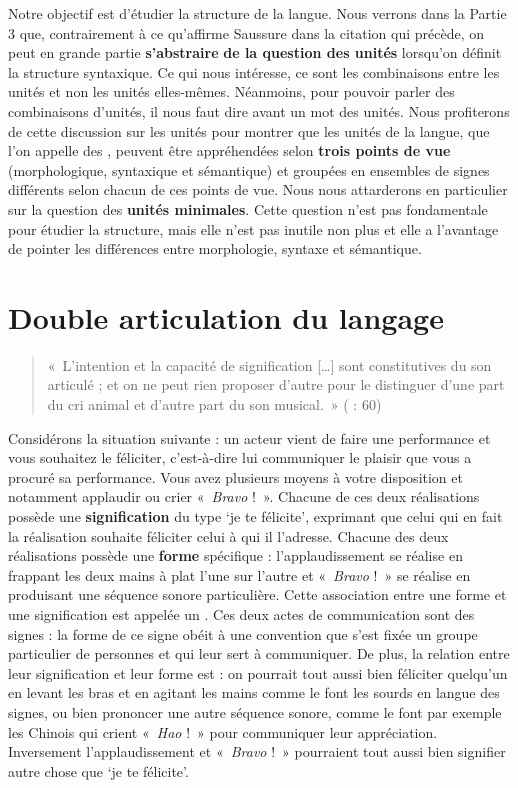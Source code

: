 Notre objectif est d’étudier la structure de la langue. Nous verrons dans la Partie 3 que, contrairement à ce qu’affirme Saussure dans la citation qui précède, on peut en grande partie \textbf{s’abstraire} \textbf{de la question des unités} lorsqu’on définit la structure syntaxique. Ce qui nous intéresse, ce sont les combinaisons entre les unités et non les unités elles-mêmes. Néanmoins, pour pouvoir parler des combinaisons d’unités, il nous faut dire avant un mot des unités. Nous profiterons de cette discussion sur les unités pour montrer que les unités de la langue, que l’on appelle des , peuvent être appréhendées selon \textbf{trois points de vue} (morphologique, syntaxique et sémantique) et groupées en ensembles de signes différents selon chacun de ces points de vue. Nous nous attarderons en particulier sur la question des \textbf{unités minimales}. Cette question n’est pas fondamentale pour étudier la structure, mais elle n’est pas inutile non plus et elle a l’avantage de pointer les différences entre morphologie, syntaxe et sémantique.

\section{Double articulation du langage}\label{sec:2.1.1}

\begin{quote}
    «~L’intention et la capacité de signification […] sont constitutives du son articulé ; et on ne peut rien proposer d’autre pour le distinguer d’une part du cri animal et d’autre part du son musical.~» (\citealt{Humboldt1836} : 60)
\end{quote}

Considérons la situation suivante : un acteur vient de faire une performance et vous souhaitez le féliciter, c’est-à-dire lui communiquer le plaisir que vous a procuré sa performance. Vous avez plusieurs moyens à votre disposition et notamment applaudir ou crier «~\textit{Bravo} !~». Chacune de ces deux réalisations possède une \textbf{signification} du type ‘je te félicite’, exprimant que celui qui en fait la réalisation souhaite féliciter celui à qui il l’adresse. Chacune des deux réalisations possède une \textbf{forme} spécifique : l’applaudis\-sement se réalise en frappant les deux mains à plat l’une sur l’autre et «~\textit{Bravo} !~» se réalise en produisant une séquence sonore particulière. Cette association entre une forme et une signification est appelée un . Ces deux actes de communication sont des signes : la forme de ce signe obéit à une convention que s’est fixée un groupe particulier de personnes et qui leur sert à communiquer. De plus, la relation entre leur signification et leur forme est : on pourrait tout aussi bien féliciter quelqu’un en levant les bras et en agitant les mains comme le font les sourds en langue des signes, ou bien prononcer une autre séquence sonore, comme le font par exemple les Chinois qui crient «~\textit{Hao} !~» pour communiquer leur appréciation. Inversement l’applaudissement et «~\textit{Bravo} !~» pourraient tout aussi bien signifier autre chose que ‘je te félicite’.

